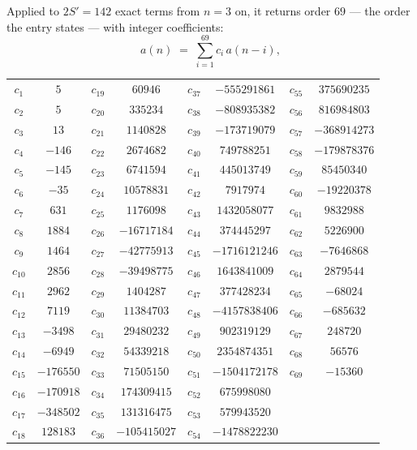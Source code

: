 \documentclass[11pt,a4paper]{article}
\theoremstyle{plain}
\theoremstyle{definition}
\begin{document}
Applied to $2S'=142$ exact terms from $n=3$ on, it returns order $69$ --- the
order the entry states --- with integer coefficients:
\[
a(n)\;=\;\sum_{i=1}^{69}c_i\,a(n-i),
\]
\begin{center}\small
\begin{tabular}{cccccccc}
$c_{1}$ & $5$ & $c_{19}$ & $60946$ & $c_{37}$ & $-555291861$ & $c_{55}$ & $375690235$ \\
$c_{2}$ & $5$ & $c_{20}$ & $335234$ & $c_{38}$ & $-808935382$ & $c_{56}$ & $816984803$ \\
$c_{3}$ & $13$ & $c_{21}$ & $1140828$ & $c_{39}$ & $-173719079$ & $c_{57}$ & $-368914273$ \\
$c_{4}$ & $-146$ & $c_{22}$ & $2674682$ & $c_{40}$ & $749788251$ & $c_{58}$ & $-179878376$ \\
$c_{5}$ & $-145$ & $c_{23}$ & $6741594$ & $c_{41}$ & $445013749$ & $c_{59}$ & $85450340$ \\
$c_{6}$ & $-35$ & $c_{24}$ & $10578831$ & $c_{42}$ & $7917974$ & $c_{60}$ & $-19220378$ \\
$c_{7}$ & $631$ & $c_{25}$ & $1176098$ & $c_{43}$ & $1432058077$ & $c_{61}$ & $9832988$ \\
$c_{8}$ & $1884$ & $c_{26}$ & $-16717184$ & $c_{44}$ & $374445297$ & $c_{62}$ & $5226900$ \\
$c_{9}$ & $1464$ & $c_{27}$ & $-42775913$ & $c_{45}$ & $-1716121246$ & $c_{63}$ & $-7646868$ \\
$c_{10}$ & $2856$ & $c_{28}$ & $-39498775$ & $c_{46}$ & $1643841009$ & $c_{64}$ & $2879544$ \\
$c_{11}$ & $2962$ & $c_{29}$ & $1404287$ & $c_{47}$ & $377428234$ & $c_{65}$ & $-68024$ \\
$c_{12}$ & $7119$ & $c_{30}$ & $11384703$ & $c_{48}$ & $-4157838406$ & $c_{66}$ & $-685632$ \\
$c_{13}$ & $-3498$ & $c_{31}$ & $29480232$ & $c_{49}$ & $902319129$ & $c_{67}$ & $248720$ \\
$c_{14}$ & $-6949$ & $c_{32}$ & $54339218$ & $c_{50}$ & $2354874351$ & $c_{68}$ & $56576$ \\
$c_{15}$ & $-176550$ & $c_{33}$ & $71505150$ & $c_{51}$ & $-1504172178$ & $c_{69}$ & $-15360$ \\
$c_{16}$ & $-170918$ & $c_{34}$ & $174309415$ & $c_{52}$ & $675998080$ &  &  \\
$c_{17}$ & $-348502$ & $c_{35}$ & $131316475$ & $c_{53}$ & $579943520$ &  &  \\
$c_{18}$ & $128183$ & $c_{36}$ & $-105415027$ & $c_{54}$ & $-1478822230$ &  &  \\
\end{tabular}
\end{center}
\end{document}
